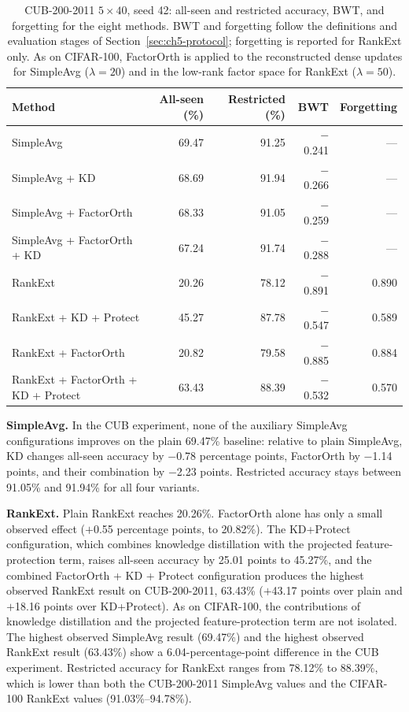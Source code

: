 \begin{table}[htbp]
\centering
\begin{tabularx}{\textwidth}{@{}X r r r r@{}}
\toprule
\textbf{Method} & \textbf{All-seen (\%)} & \textbf{Restricted (\%)} & \textbf{BWT} & \textbf{Forgetting} \\
\midrule
SimpleAvg & 69.47 & 91.25 & $-$0.241 & --- \\
SimpleAvg + KD & 68.69 & 91.94 & $-$0.266 & --- \\
SimpleAvg + FactorOrth & 68.33 & 91.05 & $-$0.259 & --- \\
SimpleAvg + FactorOrth + KD & 67.24 & 91.74 & $-$0.288 & --- \\
RankExt & 20.26 & 78.12 & $-$0.891 & 0.890 \\
RankExt + KD + Protect & 45.27 & 87.78 & $-$0.547 & 0.589 \\
RankExt + FactorOrth & 20.82 & 79.58 & $-$0.885 & 0.884 \\
RankExt + FactorOrth + KD + Protect & 63.43 & 88.39 & $-$0.532 & 0.570 \\
\bottomrule
\end{tabularx}
\caption[CUB-200-2011 8-method results]{CUB-200-2011 $5\times40$, seed 42:
all-seen and restricted accuracy, BWT, and forgetting for the eight methods.
BWT and forgetting follow the definitions and evaluation stages of
Section~\ref{sec:ch5-protocol}; forgetting is reported for RankExt only.
As on CIFAR-100, FactorOrth is applied to the reconstructed dense updates
for SimpleAvg ($\lambda=20$) and in the low-rank factor space for RankExt
($\lambda=50$).}
\label{tab:ch5-cub-main}
\end{table}

\textbf{SimpleAvg.} In the CUB experiment, none of the
auxiliary SimpleAvg configurations improves on the plain 69.47\% baseline:
relative to plain SimpleAvg, KD changes all-seen accuracy by $-$0.78
percentage points, FactorOrth by $-$1.14 points, and their combination by
$-$2.23 points. Restricted accuracy stays between 91.05\% and 91.94\% for
all four variants.

\textbf{RankExt.} Plain RankExt reaches 20.26\%. FactorOrth alone has only a
small observed effect ($+$0.55 percentage points, to 20.82\%). The
KD+Protect configuration, which combines knowledge distillation with the
projected feature-protection term, raises all-seen accuracy by 25.01 points
to 45.27\%, and the combined FactorOrth + KD + Protect configuration
produces the highest observed RankExt result on CUB-200-2011, 63.43\%
($+$43.17 points over plain and $+$18.16 points over KD+Protect). As on
CIFAR-100, the contributions of knowledge distillation and the projected
feature-protection term are not isolated. The highest observed SimpleAvg
result (69.47\%) and the highest observed RankExt result (63.43\%) show a
6.04-percentage-point difference in the CUB experiment.
Restricted accuracy for RankExt ranges from 78.12\% to 88.39\%, which is
lower than both the CUB-200-2011 SimpleAvg values and the CIFAR-100 RankExt
values (91.03\%--94.78\%).

